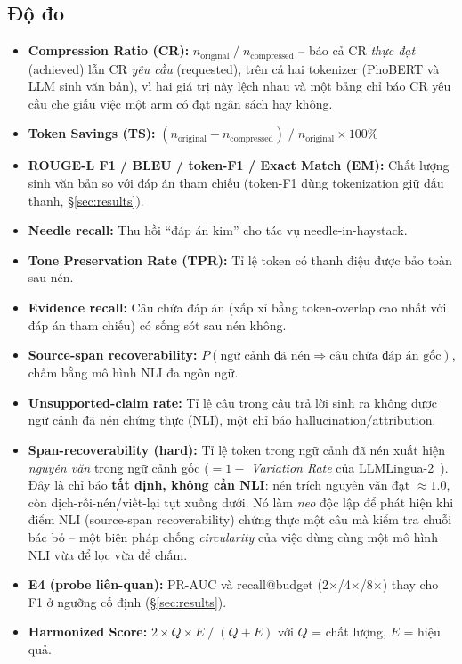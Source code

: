 \documentclass[12pt,a4paper]{article}
\begin{document}
\subsection{Độ đo}

\begin{itemize}
    \item \textbf{Compression Ratio (CR):} $n_{\text{original}} \;/\; n_{\text{compressed}}$ -- báo cả CR \textit{thực đạt} (achieved) lẫn CR \textit{yêu cầu} (requested), trên cả hai tokenizer (PhoBERT và LLM sinh văn bản), vì hai giá trị này lệch nhau và một bảng chỉ báo CR yêu cầu che giấu việc một arm có đạt ngân sách hay không.
    \item \textbf{Token Savings (TS):} $(n_{\text{original}} - n_{\text{compressed}}) \;/\; n_{\text{original}} \times 100\%$
    \item \textbf{ROUGE-L F1 / BLEU / token-F1 / Exact Match (EM):} Chất lượng sinh văn bản so với đáp án tham chiếu (token-F1 dùng tokenization giữ dấu thanh, \S\ref{sec:results}).
    \item \textbf{Needle recall:} Thu hồi ``đáp án kim'' cho tác vụ needle-in-haystack.
    \item \textbf{Tone Preservation Rate (TPR):} Tỉ lệ token có thanh điệu được bảo toàn sau nén.
    \item \textbf{Evidence recall:} Câu chứa đáp án (xấp xỉ bằng token-overlap cao nhất với đáp án tham chiếu) có sống sót sau nén không.
    \item \textbf{Source-span recoverability:} $P(\text{ngữ cảnh đã nén} \Rightarrow \text{câu chứa đáp án gốc})$, chấm bằng mô hình NLI đa ngôn ngữ.
    \item \textbf{Unsupported-claim rate:} Tỉ lệ câu trong câu trả lời sinh ra không được ngữ cảnh đã nén chứng thực (NLI), một chỉ báo hallucination/attribution.
    \item \textbf{Span-recoverability (hard):} Tỉ lệ token trong ngữ cảnh đã nén xuất hiện \textit{nguyên văn} trong ngữ cảnh gốc ($=1-$ \textit{Variation Rate} của LLMLingua-2~\cite{pan2024llmlingua2}). Đây là chỉ báo \textbf{tất định, không cần NLI}: nén trích nguyên văn đạt $\approx 1.0$, còn dịch-rồi-nén/viết-lại tụt xuống dưới. Nó làm \textit{neo} độc lập để phát hiện khi điểm NLI (source-span recoverability) chứng thực một câu mà kiểm tra chuỗi bác bỏ -- một biện pháp chống \textit{circularity} của việc dùng cùng một mô hình NLI vừa để lọc vừa để chấm.
    \item \textbf{E4 (probe liên-quan):} PR-AUC và recall@budget (2$\times$/4$\times$/8$\times$) thay cho F1 ở ngưỡng cố định (\S\ref{sec:results}).
    \item \textbf{Harmonized Score:} $2 \times Q \times E \;/\; (Q + E)$ với $Q$ = chất lượng, $E$ = hiệu quả.
\end{itemize}
\end{document}
